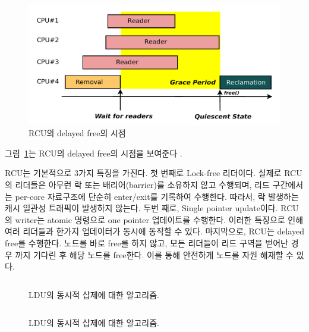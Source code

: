 \begin{figure}[h]
    \centering
    \includegraphics[width=1\textwidth]{fig/rcu/rcu_grace}
    \caption{RCU의 delayed free의 시점}
  \label{fig:rcu_grace}
\end{figure}

그림~\ref{fig:rcu_grace}는 RCU의 delayed free의 시점을 보여준다 . 


RCU는 기본적으로 3가지 특징을 가진다. 첫 번째로 Lock-free 리더이다.
실제로 RCU의 리더들은 아무런 락 또는 배리어(barrier)를 소유하지 않고 수행되며, 리드 구간에서는
 per-core 자료구조에 단순히 enter/exit를 기록하여 수행한다. 
따라서, 락 발생하는 캐시 일관성 트래픽이 발생하지 않는다.
두번 째로, Single pointer update이다.
RCU의 writer는 atomic 명령으로 one pointer 업데이트를 수행한다.
이러한 특징으로 인해 여러 리더들과 한가지 업데이터가 동시에 동작할 수 있다.  
마지막으로, RCU는 delayed free를 수행한다.
노드를 바로 free를 하지 않고, 모든 리더들이 리드 구역을 벋어난 경우 까지 
기다린 후 해당 노드를 free한다.
이를 통해 안전하게 노드를 자원 해재할 수 있다. 

\begin{figure}[h]
\begin{center}
\inputminted[linenos,fontsize=\footnotesize,
tabsize=4]{c}{src/rcu_list_data.c}
\end{center}
\caption{LDU의 동시적 삽제에 대한 알고리즘.}
\label{fig:gldulogicalupdate}
\end{figure}



\begin{figure}[h!]
\begin{center}
\inputminted[linenos,fontsize=\footnotesize,
tabsize=4]{c}{src/rcu_list_search.c}
\end{center}
\caption{LDU의 동시적 삽제에 대한 알고리즘.}
\label{fig:gldulogicalupdate}
\end{figure}


